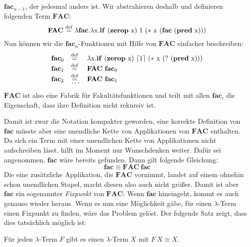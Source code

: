 $\mathbf{fac}_{n-1}$, der jedesmal anders ist.  Wir abstrahieren
deshalb und definieren folgenden Term $\mathbf{FAC}$:
%
\begin{displaymath}
  \mathbf{FAC} \stackrel{\rm def}{=}{} \lambda\mathbf{fac}.\lambda \mathrm x.\mathbf{if}~(\mathbf{zerop}~\mathrm x)~1~(\ast~\mathrm x~(\mathbf{fac}~(\mathbf{pred}~\mathrm x)))
\end{displaymath}
%
Nun können wir die
$\mathbf{fac}_n$-Funktionen mit Hilfe von $\mathbf{FAC}$ einfacher beschreiben:
%
\begin{displaymath}
\begin{array}{rcl}
   \mathbf{fac}_0 &\stackrel{\rm def}{=}{}& \lambda \mathrm x.\mathbf{if}~(\mathbf{zerop}~\mathrm x)~\lceil 1\rceil~(\ast~\mathrm x~(?~(\mathbf{pred}~\mathrm x)))\\
   \mathbf{fac}_1 &\stackrel{\rm def}{=}{}& \mathbf{FAC}~\mathbf{fac}_0\\
   \mathbf{fac}_2 &\stackrel{\rm def}{=}{}& \mathbf{FAC}~\mathbf{fac}_1\\[-2ex]
   &\ldots&
\end{array}
\end{displaymath}
% 
$\mathbf{FAC}$ ist also eine Fabrik für Fakultätsfunktionen und
teilt mit allen $\mathbf{fac}_i$ die Eigenschaft, dass ihre
Definition nicht rekursiv ist.

Damit ist zwar die Notation kompakter geworden,
eine korrekte
Definition von $\mathbf{fac}$ müsste aber eine unendliche
Kette von Applikationen von $\mathbf{FAC}$ enthalten.
Da sich ein Term mit einer unendlichen Kette von Applikationen nicht aufschreiben lässt, hilft im Moment nur Wunschdenken weiter.
Dafür sei angenommen, $\mathbf{fac}$ wäre bereits gefunden.  Dann gilt folgende
Gleichung:
%
\begin{displaymath}
  \mathbf{fac} \equiv \mathbf{FAC}~\mathbf{fac}
\end{displaymath}
%
Die eine zusätzliche Applikation, die $\mathbf{FAC}$ vornimmt, landet
auf einem ohnehin schon unendlichen Stapel,
macht diesen also auch nicht größer.  Damit ist aber $\mathbf{fac}$ ein sogenannter
\textit{Fixpunkt} von $\mathbf{FAC}$:  Wenn $\mathbf{fac}$
hineingeht, kommt es auch genauso wieder heraus.  Wenn es nun eine
Möglichkeit gäbe, für einen $\lambda$-Term einen Fixpunkt zu finden,
wäre das Problem gelöst.  Der folgende Satz zeigt, dass dies tatsächlich
möglich ist:
%
\begin{satz}[Fixpunktsatz]
  \label{satz:fixpunkt}
  Für jeden $\lambda$-Term $F$ gibt es einen $\lambda$-Term $X$ mit
  $F~X\equiv X$.
\end{satz}

